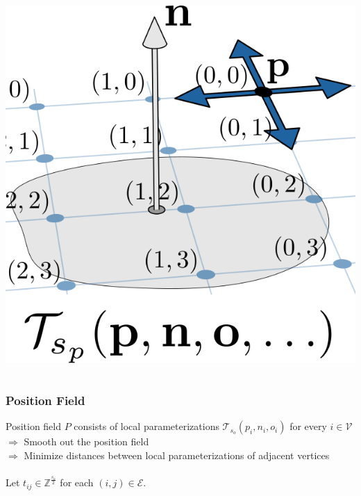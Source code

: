 \documentclass[aspectratio=43,sanserif,professionalfonts]{beamer}
\begin{document}
\begin{frame}
\begin{columns}
\begin{column}{0.2\textwidth}
			\includegraphics[width=\textwidth]{img/integer-translation.png}
		\end{column}
	\end{columns}
\end{frame}

\begin{frame}
	\frametitle{Position Field}
	Position field $P$ consists of local parameterizations $\mathcal{T}_{s_o}(p_i,n_i,o_i)$ for every $i \in \mathcal{V}$\\
	$\Rightarrow$ Smooth out the position field\\
	$\Rightarrow$ Minimize distances between local parameterizations of adjacent vertices\\
	\pause
	~\\
	Let $t_{ij} \in \mathbb{Z}^{\frac{s_o}{2}}$ for each $(i,j) \in \mathcal{E}$.\\
\end{frame}
\end{document}
